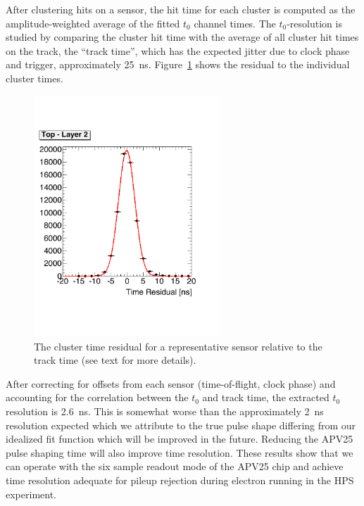 \documentclass[final,3p,times,twocolumn]{elsarticle}
\begin{document}
After clustering hits on a sensor, the hit time for each cluster is computed as the amplitude-weighted 
average of the fitted $t_0$ channel times. The $t_0$-resolution is studied by comparing the cluster hit 
time with the average of all cluster hit times on the track, the ``track time'', which has the expected jitter 
due to clock phase and trigger, approximately 25~ns. Figure~\ref{fig:tracktime} shows the residual to the individual cluster 
times. 
\begin{figure}[]
\begin{center}
{\small
	\includegraphics[width=7cm]{figures/test_run_1351_hit_time_corrected_top_layer2_mod.pdf}
	\caption{
	The cluster time residual for a representative sensor relative to the track time (see text for more 
	details). }
	\label{fig:tracktime}
}
\end{center}
\end{figure}
After correcting for offsets from each sensor (time-of-flight, clock phase) and accounting for the 
correlation between the $t_0$ and track time,  the extracted $t_0$ resolution is 2.6~ns. This is somewhat 
worse than the approximately 2~ns resolution expected which we attribute to the true 
pulse shape differing from our idealized fit function which will be improved in the future. Reducing the 
APV25 pulse shaping time will also improve time resolution. These results show that we can operate 
with the six sample readout mode of the APV25 chip and achieve time resolution adequate for pileup 
rejection during electron running in the HPS experiment. 
\end{document}
